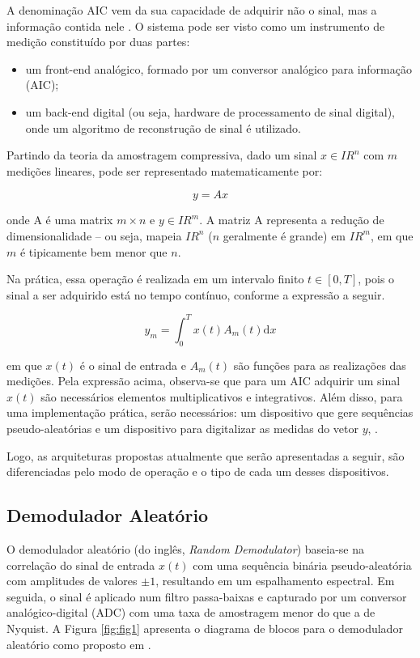 \documentclass[a4paper, 12pt]{article}
\begin{document}
A denominação AIC vem da sua capacidade de adquirir não o sinal, mas
a informação contida nele \cite{daponte2017analog}. O sistema pode ser visto como um instrumento de medição constituído por duas partes: 
\begin{itemize}
    \item um front-end analógico, formado por um conversor analógico para informação (AIC);
    \item um back-end digital (ou seja, hardware de processamento de sinal digital), onde um algoritmo de reconstrução de sinal é utilizado.
\end{itemize}

Partindo da teoria da amostragem compressiva, dado um sinal $x \in I\!R^n$ com $m$ medições lineares, pode ser representado matematicamente por:

\begin{equation}
    y = Ax
\end{equation}{}

onde A é uma matrix $m \times n$ e $y \in I\!R^m$. A matriz A representa a redução de dimensionalidade  -- ou seja, mapeia $I\!R^n$ ($n$ geralmente é grande) em $I\!R^m$, em que $m$ é tipicamente bem menor que $n$.

Na prática, essa operação é realizada em um intervalo finito $t \in [0,T]$, pois o sinal a ser adquirido está no tempo contínuo, conforme a expressão a seguir.

\begin{equation}
    y_m = \int_0^T x(t) A_m(t) \mathrm{d}x
\end{equation}{}

em que $x(t)$ é o sinal de entrada e $A_m(t)$ são funções para as realizações das medições. Pela expressão acima, observa-se que para um AIC adquirir um sinal $x(t)$ são necessários elementos multiplicativos e integrativos. Além disso, para uma implementação prática, serão necessários: um dispositivo que gere sequências pseudo-aleatórias e um dispositivo para digitalizar as medidas do vetor $y$, \cite{Bruno2019}.

Logo, as arquiteturas propostas atualmente que serão apresentadas a seguir, são diferenciadas pelo modo de operação e o tipo de cada um desses dispositivos.

\subsection{Demodulador Aleatório}

O demodulador aleatório (do inglês, \textit{Random Demodulator}) baseia-se na correlação do sinal de entrada $x(t)$ com uma sequência binária pseudo-aleatória com amplitudes de valores $\pm1$, resultando em um espalhamento espectral.
Em seguida, o sinal é aplicado num filtro passa-baixas e capturado por um conversor analógico-digital (ADC) com uma taxa de amostragem menor do que a de Nyquist.
A Figura \ref{fig:fig1} apresenta o diagrama de blocos para o demodulador aleatório como proposto em \cite{dutta2015analog}.
\end{document}
